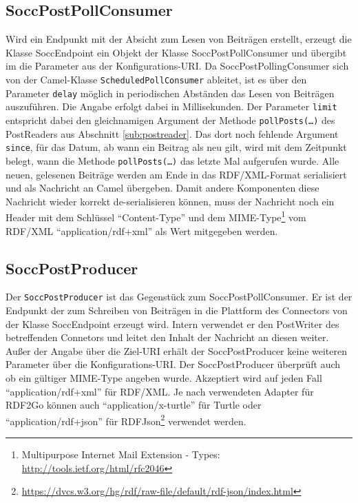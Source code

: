 \subsection{SoccPostPollConsumer} %
\label{sub:soccpostpollingconsumer}

Wird ein Endpunkt mit der Absicht zum Lesen von Beiträgen erstellt, erzeugt die Klasse SoccEndpoint ein Objekt der Klasse SoccPostPollConsumer und übergibt im die Parameter aus der Konfigurations-URI. Da SoccPostPollingConsumer sich von der Camel-Klasse \texttt{ScheduledPollConsumer} ableitet, ist es über den Parameter \texttt{delay} möglich in periodischen Abständen das Lesen von Beiträgen auszuführen. Die Angabe erfolgt dabei in Millisekunden. Der Parameter \texttt{limit} entspricht dabei den gleichnamigen Argument der Methode \texttt{pollPosts(\dots)} des PostReaders aus Abschnitt \ref{sub:postreader}. Das dort noch fehlende Argument \texttt{since}, für das Datum, ab wann ein Beitrag als neu gilt, wird mit dem Zeitpunkt belegt, wann die Methode \texttt{pollPosts(\dots)} das letzte Mal aufgerufen wurde. Alle neuen, gelesenen Beiträge werden am Ende in das RDF/XML-Format serialisiert und als Nachricht an Camel übergeben. Damit andere Komponenten diese Nachricht wieder korrekt de-serialisieren können, muss der Nachricht noch ein Header mit dem Schlüssel \enquote{Content-Type} und dem MIME-Type\footnote{ Multipurpose Internet Mail Extension - Types: \url{http://tools.ietf.org/html/rfc2046}} vom RDF/XML \enquote{application/rdf+xml} als Wert mitgegeben werden.


\subsection{SoccPostProducer} %
\label{sub:soccpostproducer}

Der \texttt{SoccPostProducer} ist das Gegenstück zum SoccPostPollConsumer. Er ist der Endpunkt der zum Schreiben von Beiträgen in die Plattform des Connectors von der Klasse SoccEndpoint erzeugt wird. Intern verwendet er den PostWriter des betreffenden Connetors und leitet den Inhalt der Nachricht an diesen weiter. Außer der Angabe über die Ziel-URI erhält der SoccPostProducer keine weiteren Parameter über die Konfigurations-URI. Der SoccPostProducer überprüft auch ob ein gültiger MIME-Type angeben wurde. Akzeptiert wird auf jeden Fall \enquote{application/rdf+xml} für RDF/XML. Je nach verwendeten Adapter für RDF2Go können auch \enquote{application/x-turtle} für Turtle oder \enquote{application/rdf+json} für RDFJson\footnote{\url{https://dvcs.w3.org/hg/rdf/raw-file/default/rdf-json/index.html}} verwendet werden.



